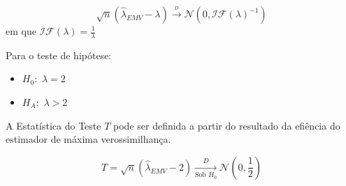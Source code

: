 \documentclass[11pt,]{article}
\providecommand{\tightlist}{%
  \setlength{\itemsep}{0pt}\setlength{\parskip}{0pt}}
\begin{document}
\[\sqrt{n}(\hat{\lambda}_{EMV}-\lambda)\xrightarrow{_D}\mathcal{N}(0,\mathcal{IF}(\lambda)^{-1})\]
em que \(\mathcal{IF}(\lambda) = \frac{1}{\lambda}\)

Para o teste de hipótese:

\begin{itemize}
\tightlist
\item
  \(H_0:\) \(\lambda = 2\)
\item
  \(H_A:\) \(\lambda > 2\)
\end{itemize}

A Estatística do Teste \(T\) pode ser definida a partir do resultado da
efiência do estimador de máxima verossimilhança.

\[T = \sqrt{n}(\hat{\lambda}_{EMV}-2)\xrightarrow[\text{Sob } H_0]{D}\mathcal{N}\left(0,\frac{1}{2} \right)\]
\end{document}
